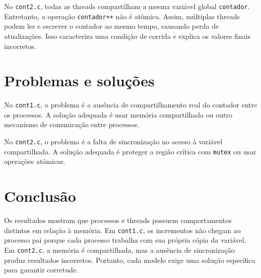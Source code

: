 \documentclass[12pt,a4paper]{article}
\begin{document}
No \texttt{cont2.c}, todas as threads compartilham a mesma vari\'avel global \texttt{contador}. Entretanto, a opera\c{c}\~ao \texttt{contador++} n\~ao \'e at\^omica. Assim, m\'ultiplas threads podem ler e escrever o contador ao mesmo tempo, causando perda de atualiza\c{c}\~oes. Isso caracteriza uma condi\c{c}\~ao de corrida e explica os valores finais incorretos.

\section*{Problemas e solu\c{c}\~oes}

No \texttt{cont1.c}, o problema \'e a aus\^encia de compartilhamento real do contador entre os processos. A solu\c{c}\~ao adequada \'e usar mem\'oria compartilhada ou outro mecanismo de comunica\c{c}\~ao entre processos.

No \texttt{cont2.c}, o problema \'e a falta de sincroniza\c{c}\~ao no acesso \`a vari\'avel compartilhada. A solu\c{c}\~ao adequada \'e proteger a regi\~ao cr\'itica com \texttt{mutex} ou usar opera\c{c}\~oes at\^omicas.

\section*{Conclus\~ao}

Os resultados mostram que processos e threads possuem comportamentos distintos em rela\c{c}\~ao \`a mem\'oria. Em \texttt{cont1.c}, os incrementos n\~ao chegam ao processo pai porque cada processo trabalha com sua pr\'opria c\'opia da vari\'avel. Em \texttt{cont2.c}, a mem\'oria \'e compartilhada, mas a aus\^encia de sincroniza\c{c}\~ao produz resultados incorretos. Portanto, cada modelo exige uma solu\c{c}\~ao espec\'ifica para garantir corretude.
\end{document}
